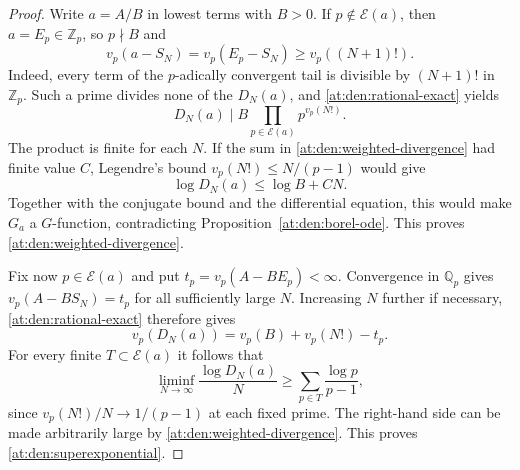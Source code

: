 \documentclass[11pt,a4paper]{article}
\newcommand{\Q}{\mathbb Q}
\newcommand{\Z}{\mathbb Z}
\theoremstyle{definition}
\theoremstyle{remark}
\numberwithin{equation}{section}
\begin{document}
\begin{proof}
Write $a=A/B$ in lowest terms with $B>0$.  If
$p\notin\mathcal E(a)$, then $a=E_p\in\Z_p$, so $p\nmid B$ and
\begin{equation}\label{at:den:tail-valuation}
 v_p(a-S_N)=v_p(E_p-S_N)\geq v_p((N+1)!).
\end{equation}
Indeed, every term of the $p$-adically convergent tail is divisible by
$(N+1)!$ in $\Z_p$.  Such a prime divides none of the $D_N(a)$, and
\eqref{at:den:rational-exact} yields
\begin{equation}\label{at:den:support-divisibility}
 D_N(a)\mid B\prod_{p\in\mathcal E(a)}p^{v_p(N!)}.
\end{equation}
The product is finite for each $N$.  If the sum in
\eqref{at:den:weighted-divergence} had finite value $C$, Legendre's
bound $v_p(N!)\leq N/(p-1)$ would give
\[
 \log D_N(a)\leq\log B+CN.
\]
Together with the conjugate bound and the differential equation, this
would make $G_a$ a $G$-function, contradicting
Proposition~\ref{at:den:borel-ode}.  This proves
\eqref{at:den:weighted-divergence}.

Fix now $p\in\mathcal E(a)$ and put
$t_p=v_p(A-BE_p)<\infty$.  Convergence in $\Q_p$ gives
$v_p(A-BS_N)=t_p$ for all sufficiently large $N$.  Increasing $N$
further if necessary, \eqref{at:den:rational-exact} therefore gives
\begin{equation}\label{at:den:stable-valuation}
 v_p(D_N(a))=v_p(B)+v_p(N!)-t_p.
\end{equation}
For every finite $T\subset\mathcal E(a)$ it follows that
\begin{equation}\label{at:den:finite-liminf}
 \liminf_{N\to\infty}\frac{\log D_N(a)}{N}
 \geq\sum_{p\in T}\frac{\log p}{p-1},
\end{equation}
since $v_p(N!)/N\to1/(p-1)$ at each fixed prime.  The right-hand side
can be made arbitrarily large by
\eqref{at:den:weighted-divergence}.  This proves
\eqref{at:den:superexponential}.
\end{proof}
\end{document}
